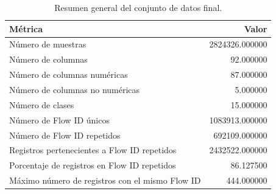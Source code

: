 \begin{table}
\caption{Resumen general del conjunto de datos final.}
\label{tab:resumen_dataset}
\begin{tabular}{lr}
\toprule
Métrica & Valor \\
\midrule
Número de muestras & 2824326.000000 \\
Número de columnas & 92.000000 \\
Número de columnas numéricas & 87.000000 \\
Número de columnas no numéricas & 5.000000 \\
Número de clases & 15.000000 \\
Número de Flow ID únicos & 1083913.000000 \\
Número de Flow ID repetidos & 692109.000000 \\
Registros pertenecientes a Flow ID repetidos & 2432522.000000 \\
Porcentaje de registros en Flow ID repetidos & 86.127500 \\
Máximo número de registros con el mismo Flow ID & 444.000000 \\
\bottomrule
\end{tabular}
\end{table}
